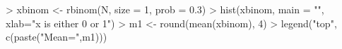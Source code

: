 \begin{Schunk}
\begin{Sinput}
> xbinom <- rbinom(N, size = 1, prob = 0.3)
> hist(xbinom, main = "", xlab="x is either 0 or 1")
> m1 <- round(mean(xbinom), 4)
> legend("top", c(paste("Mean=",m1)))
\end{Sinput}
\end{Schunk}
